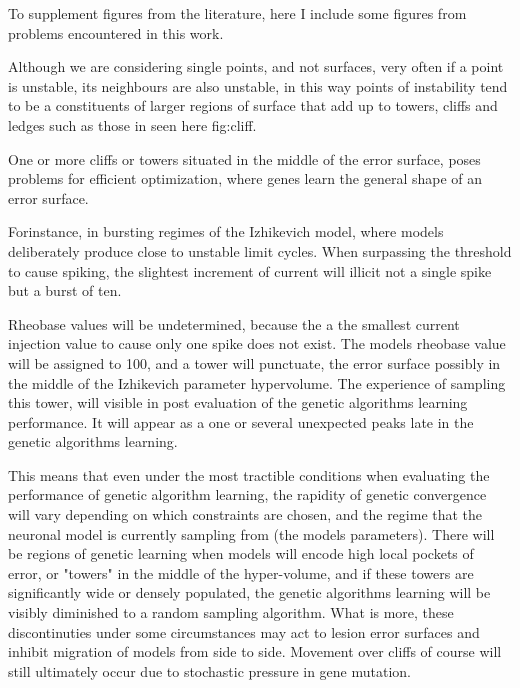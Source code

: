 
To supplement figures from the literature, here I include some figures from problems encountered in this work.

Although we are considering single points, and not surfaces, very often if a point is unstable, its neighbours are also unstable, in this way points of instability tend to be a constituents of larger regions of surface that add up to towers, cliffs and ledges such as those in seen here {fig:cliff}.

One or more cliffs or towers situated in the middle of the error surface, poses problems for efficient optimization, where genes learn the general shape of an error surface. %


Forinstance, in bursting regimes of the Izhikevich model, where models deliberately produce close to unstable limit cycles. When surpassing the threshold to cause spiking, the slightest increment of current  will illicit not a single spike but a burst of ten.

Rheobase values will be undetermined, because the a the smallest current injection value to cause only one spike does not exist. The models rheobase value will be assigned to 100, and a tower will punctuate, the error surface possibly in the middle of the Izhikevich parameter hypervolume. The experience of sampling this tower, will visible in post evaluation of the genetic algorithms learning performance. It will appear as a one or several unexpected peaks late in the genetic algorithms learning.

This means that even under the most tractible conditions when evaluating the performance of genetic algorithm learning, the rapidity of genetic convergence will vary depending on which constraints are chosen, and the regime that the neuronal model is currently sampling from (the models parameters). There will be regions of genetic learning when models will encode high local pockets of error, or "towers" in the middle of the hyper-volume, and if these towers are significantly wide or densely populated, the genetic algorithms learning will be visibly diminished to a random sampling algorithm. What is more, these discontinuties under some circumstances may act to lesion error surfaces and inhibit migration of models from side to side. Movement over cliffs of course will still ultimately occur due to stochastic pressure in gene mutation.

